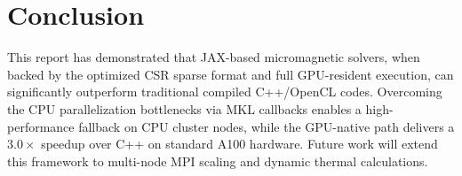 \documentclass[11pt,a4paper]{article}
\begin{document}
\section{Conclusion}
This report has demonstrated that JAX-based micromagnetic solvers, when backed by the optimized CSR sparse format and full GPU-resident execution, can significantly outperform traditional compiled C++/OpenCL codes. Overcoming the CPU parallelization bottlenecks via MKL callbacks enables a high-performance fallback on CPU cluster nodes, while the GPU-native path delivers a $3.0\times$ speedup over C++ on standard A100 hardware. Future work will extend this framework to multi-node MPI scaling and dynamic thermal calculations.



\end{document}
